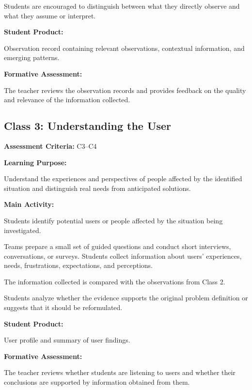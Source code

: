 \documentclass[12pt,a4paper]{article}
\begin{document}
	Students are encouraged to distinguish between what they directly observe and what they assume or interpret.
	
	\textbf{Student Product:}
	
	Observation record containing relevant observations, contextual information, and emerging patterns.
	
	\textbf{Formative Assessment:}
	
	The teacher reviews the observation records and provides feedback on the quality and relevance of the information collected.
	
	
	\subsection{Class 3: Understanding the User}
	
	\textbf{Assessment Criteria:} C3--C4
	
	\textbf{Learning Purpose:}
	
	Understand the experiences and perspectives of people affected by the identified situation and distinguish real needs from anticipated solutions.
	
	\textbf{Main Activity:}
	
	Students identify potential users or people affected by the situation being investigated.
	
	Teams prepare a small set of guided questions and conduct short interviews, conversations, or surveys. Students collect information about users' experiences, needs, frustrations, expectations, and perceptions.
	
	The information collected is compared with the observations from Class 2.
	
	Students analyze whether the evidence supports the original problem definition or suggests that it should be reformulated.
	
	\textbf{Student Product:}
	
	User profile and summary of user findings.
	
	\textbf{Formative Assessment:}
	
	The teacher reviews whether students are listening to users and whether their conclusions are supported by information obtained from them.
	
	
\end{document}
